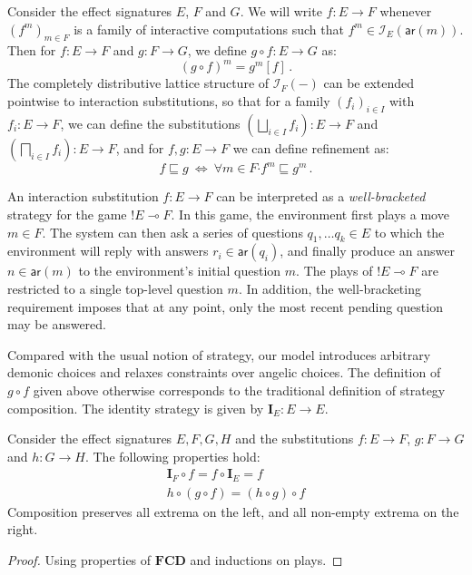\documentclass[sigplan,screen]{acmart}
\newcommand{\kw}[1]{\ensuremath{ \mathsf{#1} }}
\newcommand{\bdot}{\boldsymbol{\cdot}}
\begin{document}
\begin{definition}
Consider the effect signatures $E$, $F$ and $G$.
We will write $f : E \rightarrow F$
whenever $(f^m)_{m \in F}$ is a family of interactive computations
such that $f^m \in \mathcal{I}_E(\kw{ar}(m))$.
Then for $f : E \rightarrow F$ and $g : F \rightarrow G$,
we define $g \circ f : E \rightarrow G$ as:
\[ (g \circ f)^m = g^m[f] \,. \]
The completely distributive lattice structure
of $\mathcal{I}_F(-)$ can be extended pointwise
to interaction substitutions,
so that for a family $(f_i)_{i \in I}$
with $f_i : E \rightarrow F$,
we can define the substitutions
$(\bigsqcup_{i \in I} f_i) : E \rightarrow F$ and
$(\bigsqcap_{i \in I} f_i) : E \rightarrow F$,
and for $f, g : E \rightarrow F$
we can define refinement as:
\[
    f \sqsubseteq g \: \Leftrightarrow \:
    \forall m \in F \bdot f^m \sqsubseteq g^m \,.
\]
\end{definition}

An interaction substitution $f : E \rightarrow F$
can be interpreted as a \emph{well-bracketed} strategy for the game
${!E} \multimap F$.
In this game,
the environment first plays a move $m \in F$.
The system can then ask a series of questions
$q_1, \ldots q_k \in E$
to which the environment will reply with
answers $r_i \in \kw{ar}(q_i)$,
and finally produce an answer $n \in \kw{ar}(m)$
to the environment's initial question $m$.
The plays of ${!E} \multimap F$
are restricted to a single top-level question $m$.
In addition, the well-bracketing requirement
imposes that at any point,
only the most recent pending question
may be answered.

Compared with the usual notion of strategy,
our model introduces arbitrary demonic choices and
relaxes constraints over angelic choices.
The definition of $g \circ f$ given above
otherwise corresponds to the traditional
definition of strategy composition.
The identity strategy is given by $\mathbf{I}_E : E \rightarrow E$.

\begin{lemma}
Consider the effect signatures $E, F, G, H$ and
the substitutions
$f : E \rightarrow F$,
$g : F \rightarrow G$ and
$h : G \rightarrow H$.
The following properties hold:
\begin{gather*}
  \mathbf{I}_F \circ f = f \circ \mathbf{I}_E = f \\
  h \circ (g \circ f) = (h \circ g) \circ f
\end{gather*}
Composition preserves all extrema on the left,
and all non-empty extrema on the right.
\begin{proof}
Using properties of $\mathbf{FCD}$
and inductions on plays.
\end{proof}
\end{lemma}
\end{document}
